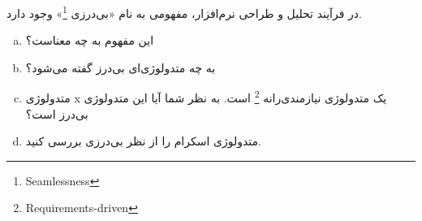  در فرآیند تحلیل و طراحی نرم‌افزار، مفهومی به نام «بی‌درزی \footnote{Seamlessness}» وجود دارد.
\begin{enumerate}[a)]
	\item 
این مفهوم به چه معناست؟
	 \item 
به چه متدولوژی‌ای بی‌درز گفته می‌شود؟
	\item
متدولوژی x یک متدولوژی نیازمندی‌رانه \footnote{Requirements-driven} است. به نظر شما آیا این متدولوژی بی‌درز است؟
	\item
متدولوژی اسکرام را از نظر بی‌درزی بررسی کنید.
\end{enumerate}


